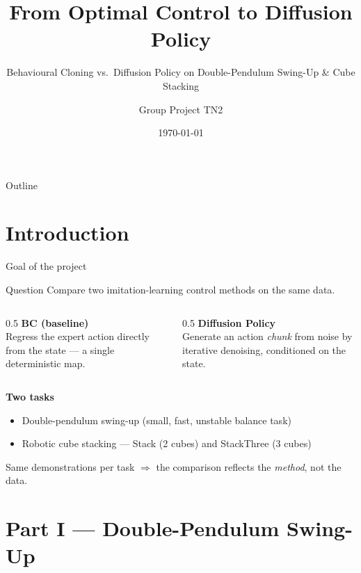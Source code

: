 \documentclass[aspectratio=169,11pt]{beamer}
\title{From Optimal Control to Diffusion Policy}
\subtitle{Behavioural Cloning vs.\ Diffusion Policy on Double-Pendulum Swing-Up \& Cube Stacking}
\author{Group Project TN2}
\date{\today}
\newcommand{\BC}{\textcolor{bcblue}{\textbf{BC}}}
\newcommand{\DP}{\textcolor{dpred}{\textbf{Diffusion}}}
\begin{document}
\maketitle

\begin{frame}{Outline}
  \tableofcontents
\end{frame}

\section{Introduction}

\begin{frame}{Goal of the project}
  \begin{block}{Question}
    Compare two \alert{imitation-learning} control methods on the same data.
  \end{block}
  \begin{columns}[T]
    \begin{column}{0.5\textwidth}
      \textbf{\BC{} (baseline)}\\
      Regress the expert action directly from the state — a single deterministic map.
    \end{column}
    \begin{column}{0.5\textwidth}
      \textbf{\DP{} Policy}\\
      Generate an action \emph{chunk} from noise by iterative denoising, conditioned on the state.
    \end{column}
  \end{columns}
  \vfill
  \textbf{Two tasks}
  \begin{itemize}
    \item Double-pendulum \alert{swing-up} (small, fast, unstable balance task)
    \item Robotic \alert{cube stacking} — Stack (2 cubes) and StackThree (3 cubes)
  \end{itemize}
  Same demonstrations per task $\Rightarrow$ the comparison reflects the \emph{method}, not the data.
\end{frame}

\section{Part I — Double-Pendulum Swing-Up}
\end{document}
